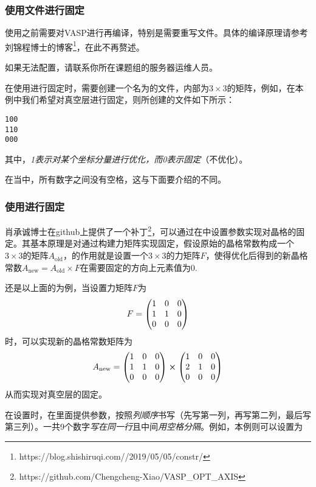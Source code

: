 \subsubsection{使用文件进行固定}

\begin{extend}
    使用之前需要对VASP进行再编译，特别是需要重写文件。具体的编译原理请参考刘锦程博士的博客\footnote{https://blog.shishiruqi.com//2019/05/05/constr/}，在此不再赘述。

    如果无法配置，请联系你所在课题组的服务器运维人员。
\end{extend}

在使用进行固定时，需要创建一个名为的文件，内部为$3\times3$的矩阵，例如，在本例中我们希望对真空层进行固定，则所创建的文件如下所示：

\begin{lstlisting}[caption=OPTCELL]
100
110
000
\end{lstlisting}

其中，\emph{1表示对某个坐标分量进行优化，而0表示固定}（不优化）。

\begin{attention}
    在当中，所有数字之间没有空格，这与下面要介绍的不同。
\end{attention}

\subsubsection{使用进行固定}

肖承诚博士在github上提供了一个补丁\footnote{https://github.com/Chengcheng-Xiao/VASP\_OPT\_AXIS}，可以通过在中设置参数实现对晶格的固定。其基本原理是对通过构建力矩阵实现固定，假设原始的晶格常数构成一个$3\times3$的矩阵$A_\text{old}$，的作用就是设置一个$3\times3$的力矩阵$F$，使得优化后得到的新晶格常数$A_\text{new}=A_\text{old}\times F$在需要固定的方向上元素值为0.

还是以上面的为例，当设置力矩阵$F$为
\begin{equation*}
    F=\mqty(1&0&0\\1&1&0\\0&0&0)
\end{equation*}
时，可以实现新的晶格常数矩阵为
\begin{equation*}
    A_\text{new}=\mqty(1&0&0\\1&1&0\\0&0&0)\cross\mqty(1&0&0\\2&1&0\\0&0&0)
\end{equation*}
从而实现对真空层的固定。

在设置时，在里面提供参数，按照\emph{列顺序}书写（先写第一列，再写第二列，最后写第三列）。一共9个数字\emph{写在同一行}且中间\emph{用空格分隔}。例如，本例则可以设置为
